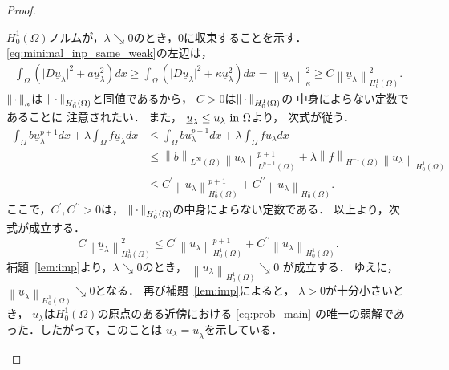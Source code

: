 \begin{proof}
\begin{enumerate}[1.]
        $H_0^1(\Omega)$ノルムが，$\lambda \searrow
        0$のとき，$0$に収束することを示す．
        \eqref{eq:minimal_inp_same_weak}の左辺は，
        \begin{align*}
         \int_\Omega \left( \lvert D\underline{u}_\lambda \rvert^2 + a
                      \underline{u}_\lambda^2 \right) dx 
         \geq 
         \int_\Omega \left( \lvert
         D\underline{u}_\lambda
         \rvert^2 +
         \kappa \underline{u}_\lambda^2 \right) dx = \left\|
         \underline{u}_\lambda \right\|_\kappa^2
         \geq C
         \left\| \underline{u}_\lambda \right\|_{H_0^1(\Omega)}^2.
        \end{align*}
        $\left\|\, \cdot \, \right\|_{\kappa}$は
        $\left\|\, \cdot \, \right\|_{H_0^1(\Omega)}$と同値であるから，
        $C > 0$は$\left\|\, \cdot \, \right\|_{H_0^1(\Omega)}$の
        中身によらない定数であることに
        注意されたい．
        また，
        $\underline{u}_\lambda \leq u_\lambda ~\text{in}~ \Omega$より，
        次式が従う．
        \begin{align*}
         \int_\Omega b\underline{u}_\lambda^{p+1} dx 
          + \lambda \int_\Omega f \underline{u}_\lambda dx
         &\leq \int_\Omega b u_\lambda^{p+1}
         dx + \lambda \int_\Omega f u_\lambda dx \\
         &\leq \left\| b \right\|_{L^\infty(\Omega)} \left\|
         u_\lambda \right\|_{L^{p+1}(\Omega)}^{p+1} +
         \lambda \left\| f \right\|_{H^{-1}(\Omega)} \left\|
         u_\lambda \right\|_{H^1_0(\Omega)} \\
         &\leq C^\prime \left\|
         u_\lambda \right\|_{H_0^1(\Omega)}^{p+1} +
         C^{\prime\prime} \left\| u_\lambda
         \right\|_{H_0^1(\Omega)}.
        \end{align*}
        ここで，$C^\prime, C^{\prime\prime} > 0$は，
        $\left\|\, \cdot \, \right\|_{H_0^1(\Omega)}$の中身によらない定数である．
        以上より，次式が成立する．
        \[
         C
        \left\| \underline{u}_\lambda \right\|_{H_0^1(\Omega)}^2 \leq 
        C^\prime \left\|
        u_\lambda \right\|_{H_0^1(\Omega)}^{p+1} +
        C^{\prime\prime}
        \left\| u_\lambda \right\|_{H_0^1(\Omega)}.
        \]
        補題~\ref{lem:imp}より，$\lambda \searrow 0$のとき，
        $\left\| u_\lambda \right\|_{H_0^1(\Omega)} \searrow 0$
        が成立する．
        ゆえに，$\left\| \underline{u}_\lambda
        \right\|_{H_0^1(\Omega)}
        \searrow 0$となる．
        再び補題~\ref{lem:imp}によると，
        $\lambda > 0$が十分小さいとき，
        $u_\lambda$は$H_0^1(\Omega)$の原点のある近傍における
        \ref{eq:prob_main}
        の唯一の弱解であった．したがって，このことは
        $u_\lambda = \underline{u}_\lambda$を示している． \qedhere
 \end{enumerate}
\end{proof}

